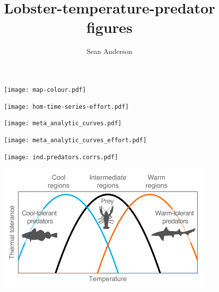 \documentclass[12pt]{article}
\title{Lobster-temperature-predator figures}
\author{Sean Anderson}
\begin{document}

\begin{figure}[htbp]
  \centering
    \texttt{[image: map-colour.pdf]}
  \caption{}
  \label{fig:lobmap.pdf}
\end{figure}

\begin{figure}[htbp]
  \centering
    \texttt{[image: hom-time-series-effort.pdf]}
  \caption{}
  \label{fig:home-ti}
\end{figure}


\begin{figure}[htbp]
  \centering
    \texttt{[image: meta\_analytic\_curves.pdf]}
    \caption{}
  \label{fig:meta_analytic_curves.pdf}
\end{figure}

\begin{figure}[htbp]
  \centering
    \texttt{[image: meta\_analytic\_curves\_effort.pdf]}
  \caption{}
  \label{fig:ind.predators.corrs.pdf}
\end{figure}



\begin{figure}[htbp]
  \centering
    \texttt{[image: ind.predators.corrs.pdf]}
  \caption{}
  \label{fig:ind.predators.corrs.pdf}
\end{figure}

\clearpage

\begin{figure}[htbp]
  \centering
    \includegraphics[height=2.5in]{optimal-curves-simple.pdf}
  \caption{}
  \label{fig:ind.predators.corrs.pdf}
\end{figure}
\end{document}
